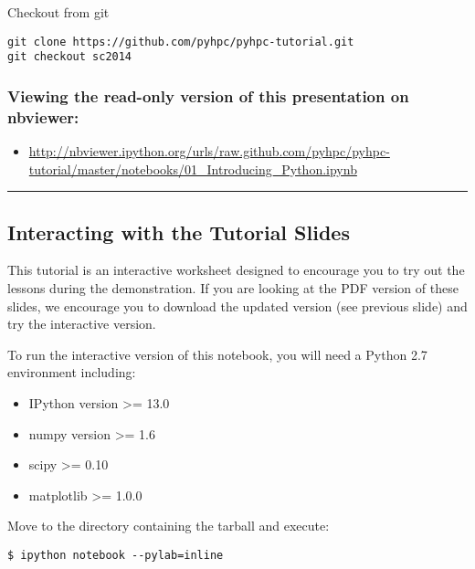 \documentclass{article}
\begin{document}
Checkout from git

\begin{verbatim}
git clone https://github.com/pyhpc/pyhpc-tutorial.git
git checkout sc2014
\end{verbatim}

\subsubsection{Viewing the read-only version of this presentation on
nbviewer:}\label{viewing-the-read-only-version-of-this-presentation-on-nbviewer}

\begin{itemize}
\itemsep1pt\parskip0pt
\item
  \url{http://nbviewer.ipython.org/urls/raw.github.com/pyhpc/pyhpc-tutorial/master/notebooks/01\_Introducing\_Python.ipynb}
\end{itemize}

    \begin{center}\rule{3in}{0.4pt}\end{center}

\subsection{Interacting with the Tutorial
Slides}\label{interacting-with-the-tutorial-slides}

This tutorial is an interactive worksheet designed to encourage you to
try out the lessons during the demonstration. If you are looking at the
PDF version of these slides, we encourage you to download the updated
version (see previous slide) and try the interactive version.

To run the interactive version of this notebook, you will need a Python
2.7 environment including:

\begin{itemize}
\itemsep1pt\parskip0pt
\item
  IPython version \textgreater{}= 13.0
\item
  numpy version \textgreater{}= 1.6
\item
  scipy \textgreater{}= 0.10
\item
  matplotlib \textgreater{}= 1.0.0
\end{itemize}

Move to the directory containing the tarball and execute:

\begin{verbatim}
$ ipython notebook --pylab=inline
\end{verbatim}
\end{document}
